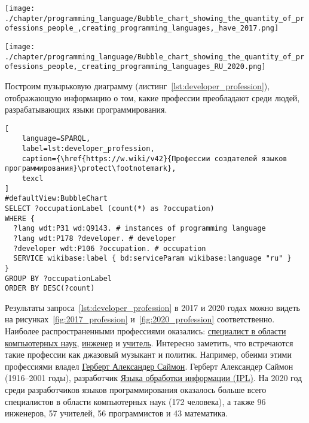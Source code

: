 \begin{marginfigure}[0pt]
\texttt{[image: ./chapter/programming\_language/Bubble\_chart\_showing\_the\_quantity\_of\_professions\_people\_,creating\_programming\_languages,\_have\_2017.png]}
  \caption[Профессии разработчиков языков программирования, 2017 год.]{Профессии разработчиков языков программирования, 2017 год. Размер пузырька показывает число разработчиков с соответствуюшей профессией.}
  \label{fig:2017_profession}
\end{marginfigure}
\begin{marginfigure}[-12pt]
\texttt{[image: ./chapter/programming\_language/Bubble\_chart\_showing\_the\_quantity\_of\_professions\_people,\_creating\_programming\_languages\_RU\_2020.png]}
  \caption[Профессии разработчиков языков программирования программирования, 2020 год.]{Профессии разработчиков языков программирования программирования, 2020 год. Размер пузырька показывает число разработчиков с соответствуюшей профессией.}
  \label{fig:2020_profession}
\end{marginfigure}
Построим пузырьковую диаграмму (листинг~\ref{lst:developer_profession}), отображающую информацию о том, какие профессии преобладают среди людей, разрабатывающих языки программирования.
\begin{lstlisting}[
	language=SPARQL,
	label=lst:developer_profession,
	caption={\href{https://w.wiki/v42}{Профессии создателей языков программирования}\protect\footnotemark},
	texcl
]
#defaultView:BubbleChart
SELECT ?occupationLabel (count(*) as ?occupation)
WHERE {
  ?lang wdt:P31 wd:Q9143. # instances of programming language 
  ?lang wdt:P178 ?developer. # developer
  ?developer wdt:P106 ?occupation. # occupation
  SERVICE wikibase:label { bd:serviceParam wikibase:language "ru" }
}
GROUP BY ?occupationLabel 
ORDER BY DESC(?count)
\end{lstlisting}

Результаты запроса~\ref{lst:developer_profession} в 2017 и 2020 годах можно видеть на рисунках~\ref{fig:2017_profession} и~\ref{fig:2020_profession} соответственно.
Наиболее распространенными профессиями оказались: 
\href{https://www.wikidata.org/wiki/Q21198}{специалист в области компьютерных наук}, 
\href{https://www.wikidata.org/wiki/Q81096}{инженер} 
и \href{https://www.wikidata.org/wiki/Q37226}{учитель}. 
Интересно заметить, что встречаются такие профессии как джазовый музыкант и политик. 
Например, обеими этими профессиями владел 
\href{https://www.wikidata.org/wiki/Q181529}{Герберт Александер Саймон}. 
Герберт Александер Саймон (1916--2001 годы), разработчик \href{https://en.wikipedia.org/wiki/Information_Processing_Language}{Языка обработки информации (IPL)}. 
На 2020 год среди разработчиков языков программирования оказалось больше всего специалистов 
в области компьютерных наук (172 человека), а также 96 инженеров, 57 учителей, 56 программистов и 43 математика.



